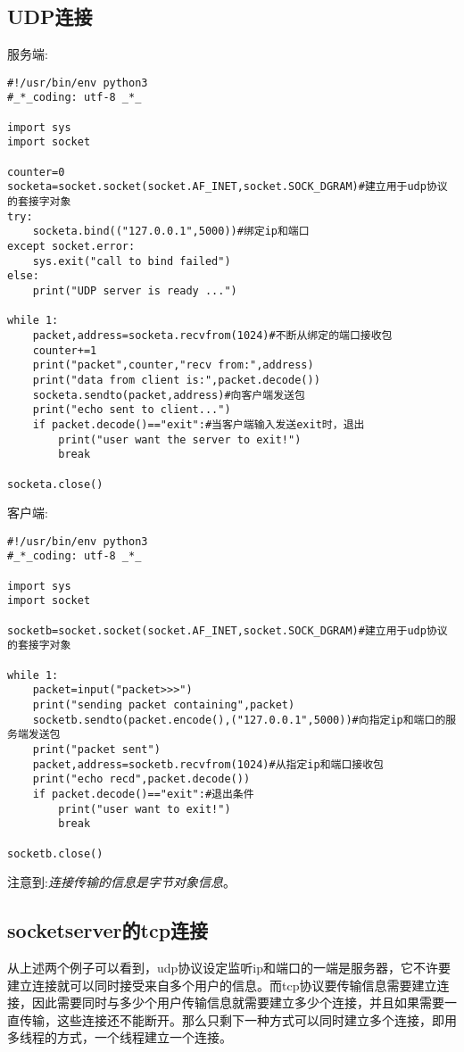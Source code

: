 \documentclass[twoside,11pt]{book}
\begin{document}
\subsection{UDP连接}
服务端:
\begin{lstlisting}
#!/usr/bin/env python3
#_*_coding: utf-8 _*_

import sys
import socket

counter=0
socketa=socket.socket(socket.AF_INET,socket.SOCK_DGRAM)#建立用于udp协议的套接字对象
try:
    socketa.bind(("127.0.0.1",5000))#绑定ip和端口
except socket.error:
    sys.exit("call to bind failed")
else:
    print("UDP server is ready ...")

while 1:
    packet,address=socketa.recvfrom(1024)#不断从绑定的端口接收包
    counter+=1
    print("packet",counter,"recv from:",address)
    print("data from client is:",packet.decode())
    socketa.sendto(packet,address)#向客户端发送包
    print("echo sent to client...")
    if packet.decode()=="exit":#当客户端输入发送exit时，退出
        print("user want the server to exit!")
        break

socketa.close()
\end{lstlisting}

客户端:
\begin{lstlisting}
#!/usr/bin/env python3
#_*_coding: utf-8 _*_

import sys
import socket

socketb=socket.socket(socket.AF_INET,socket.SOCK_DGRAM)#建立用于udp协议的套接字对象

while 1:
    packet=input("packet>>>")
    print("sending packet containing",packet)
    socketb.sendto(packet.encode(),("127.0.0.1",5000))#向指定ip和端口的服务端发送包
    print("packet sent")
    packet,address=socketb.recvfrom(1024)#从指定ip和端口接收包
    print("echo recd",packet.decode())
    if packet.decode()=="exit":#退出条件
        print("user want to exit!")
        break

socketb.close()
\end{lstlisting}
注意到:\emph{连接传输的信息是字节对象信息}。

\subsection{socketserver的tcp连接}

从上述两个例子可以看到，udp协议设定监听ip和端口的一端是服务器，它不许要建立连接就可以同时接受来自多个用户的信息。而tcp协议要传输信息需要建立连接，因此需要同时与多少个用户传输信息就需要建立多少个连接，并且如果需要一直传输，这些连接还不能断开。那么只剩下一种方式可以同时建立多个连接，即用多线程的方式，一个线程建立一个连接。
\end{document}
